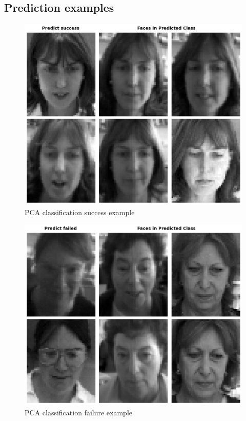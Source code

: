 \subsection{Prediction examples}
\begin{figure}
	\centering
	\includegraphics[width=0.8\linewidth]{image/q1_success.png}
	
	\caption{PCA classification success example}
	\label{fig:q3_success}
\end{figure}

\begin{figure}
	\centering
	\includegraphics[width=0.8\linewidth]{image/q1_fail.png}
	
	\caption{PCA classification failure example}
	\label{fig:q3_fail}
\end{figure}

